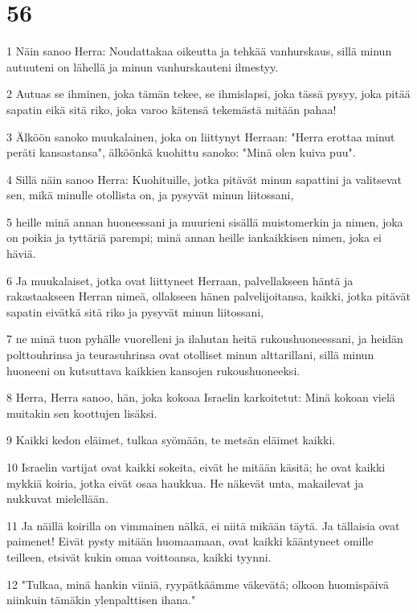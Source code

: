 \chapter{56}

\par 1 Näin sanoo Herra: Noudattakaa oikeutta ja tehkää vanhurskaus, sillä minun autuuteni on lähellä ja minun vanhurskauteni ilmestyy.
\par 2 Autuas se ihminen, joka tämän tekee, se ihmislapsi, joka tässä pysyy, joka pitää sapatin eikä sitä riko, joka varoo kätensä tekemästä mitään pahaa!
\par 3 Älköön sanoko muukalainen, joka on liittynyt Herraan: "Herra erottaa minut peräti kansastansa", älköönkä kuohittu sanoko: "Minä olen kuiva puu".
\par 4 Sillä näin sanoo Herra: Kuohituille, jotka pitävät minun sapattini ja valitsevat sen, mikä minulle otollista on, ja pysyvät minun liitossani,
\par 5 heille minä annan huoneessani ja muurieni sisällä muistomerkin ja nimen, joka on poikia ja tyttäriä parempi; minä annan heille iankaikkisen nimen, joka ei häviä.
\par 6 Ja muukalaiset, jotka ovat liittyneet Herraan, palvellakseen häntä ja rakastaakseen Herran nimeä, ollakseen hänen palvelijoitansa, kaikki, jotka pitävät sapatin eivätkä sitä riko ja pysyvät minun liitossani,
\par 7 ne minä tuon pyhälle vuorelleni ja ilahutan heitä rukoushuoneessani, ja heidän polttouhrinsa ja teurasuhrinsa ovat otolliset minun alttarillani, sillä minun huoneeni on kutsuttava kaikkien kansojen rukoushuoneeksi.
\par 8 Herra, Herra sanoo, hän, joka kokoaa Israelin karkoitetut: Minä kokoan vielä muitakin sen koottujen lisäksi.
\par 9 Kaikki kedon eläimet, tulkaa syömään, te metsän eläimet kaikki.
\par 10 Israelin vartijat ovat kaikki sokeita, eivät he mitään käsitä; he ovat kaikki mykkiä koiria, jotka eivät osaa haukkua. He näkevät unta, makailevat ja nukkuvat mielellään.
\par 11 Ja näillä koirilla on vimmainen nälkä, ei niitä mikään täytä. Ja tällaisia ovat paimenet! Eivät pysty mitään huomaamaan, ovat kaikki kääntyneet omille teilleen, etsivät kukin omaa voittoansa, kaikki tyynni.
\par 12 "Tulkaa, minä hankin viiniä, ryypätkäämme väkevätä; olkoon huomispäivä niinkuin tämäkin ylenpalttisen ihana."

